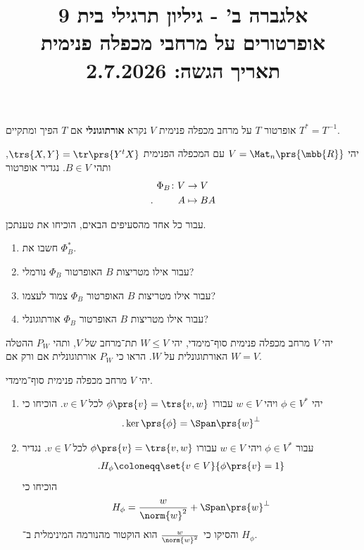 \documentclass[a4paper,10pt,twoside,openany]{article}
\title{
אלגברה ב' - גיליון תרגילי בית 9 \\
אופרטורים על מרחבי מכפלה פנימית
\\
\vspace{1cm}
\large{תאריך הגשה: 2.7.2026}
}
\date{}
\begin{document}
\maketitle

\begin{definition}
אופרטור
$T$
על מרחב מכפלה פנימית
$V$
נקרא
\textbf{אורתוגונלי}
אם
$T$
הפיך ומתקיים
$T^* = T^{-1}$.
\end{definition}

\begin{exercise}
יהי
$V = \Mat_n\prs{\mbb{R}}$
עם המכפלה הפנימית
$\trs{X,Y} = \tr\prs{Y^t X}$,
ותהי
$B \in V$.
נגדיר אופרטור
\begin{align*}
\Phi_B \colon V &\to V \\
\text{.} \hphantom{lalala} A &\mapsto BA
\end{align*}

עבור כל אחד מהסעיפים הבאים, הוכיחו את טענתכן.

\begin{enumerate}
\item
חשבו את
$\Phi_B^*$.
\item
עבור אילו מטריצות
$B$
האופרטור
$\Phi_B$
נורמלי?
\item
עבור אילו מטריצות
$B$
האופרטור
$\Phi_B$
צמוד לעצמו?
\item
עבור אילו מטריצות
$B$
האופרטור
$\Phi_B$
אורתוגונלי?
\end{enumerate}
\end{exercise}

\begin{exercise}
יהי
$V$
מרחב מכפלה פנימית סוף־מימדי, יהי
$W \leq V$
תת־מרחב של
$V$,
ותהי
$P_W$
ההטלה האורתוגונלית על
$W$.
הראו כי
$P_W$
אורתוגונלית אם ורק אם
$W = V$.
\end{exercise}

\begin{exercise}
יהי
$V$
מרחב מכפלה פנימית סוף־מימדי.

\begin{enumerate}
\item יהי
$\phi \in V^*$
ויהי
$w \in V$
עבורו
$\phi\prs{v} = \trs{v, w}$
לכל
$v \in V$.
הוכיחו כי
\[\text{.} \ker\prs{\phi} = \Span\prs{w}^\perp\]

\item עבור
$\phi \in V^*$
ויהי
$w \in V$
עבורו
$\phi\prs{v} = \trs{v,w}$
לכל
$v \in V$.
נגדיר
\begin{align*}
\text{.} H_{\phi} \coloneqq \set{v \in V}{\phi\prs{v} = 1}
\end{align*}
הוכיחו כי
\begin{align*}
H_\phi = \frac{w}{\norm{w}^2} + \Span\prs{w}^\perp
\end{align*}
והסיקו כי
$\frac{w}{\norm{w}^2}$
הוא הוקטור מהנורמה המינימלית ב־%
$H_\phi$.
\end{enumerate}
\end{exercise}
\end{document}
